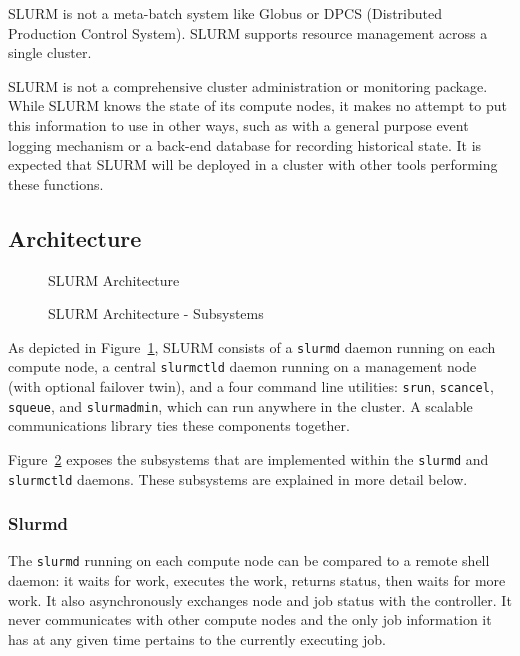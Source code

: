 SLURM is not a meta-batch system like Globus or DPCS (Distributed Production 
Control System).  SLURM supports resource management across a single cluster.

SLURM is not a comprehensive cluster administration or monitoring package.  
While SLURM knows the state of its compute nodes, it makes no attempt to put
this information to use in other ways, such as with a general purpose event
logging mechanism or a back-end database for recording historical state.
It is expected that SLURM will be deployed in a cluster with other 
tools performing these functions. 

\subsection{Architecture}

\begin{figure}[htb]
\centerline{}
\caption{SLURM Architecture}
\label{arch}
\end{figure}

\begin{figure}[htb]
\centerline{}
\caption{SLURM Architecture - Subsystems}
\label{archdetail}
\end{figure}


As depicted in Figure~\ref{arch}, SLURM consists of 
a {\tt slurmd} daemon running on each compute node, 
a central {\tt slurmctld} daemon running on a management node (with optional 
failover twin), 
and a four command line utilities: {\tt srun}, {\tt scancel}, {\tt squeue}, 
and {\tt slurmadmin}, which can run anywhere in the cluster.
A scalable communications library ties these components together.

Figure~\ref{archdetail} exposes the subsystems that are implemented within
the {\tt slurmd} and {\tt slurmctld} daemons.  These subsystems are explained
in more detail below.

\subsubsection{Slurmd}

The {\tt slurmd} running
on each compute node can be compared to a remote shell daemon:  it waits 
for work, executes the work, returns status, then waits for more work.  
It also asynchronously exchanges node and job status with the controller.  
It never communicates with other compute nodes and the only job information 
it has at any given time pertains to the currently executing job.


